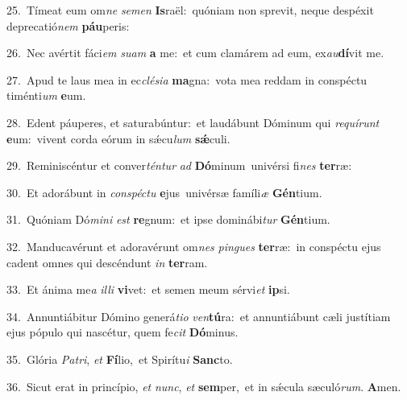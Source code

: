 {\numbfont\textcolor{\numbcolor}{25.}}~Tímeat eum om\textit{ne} \textit{se}\-\textit{men} \textbf{Is}\-raël:~\star quóniam non sprevit, neque despéxit deprecatió\textit{nem} \textbf{páu}\-peris:\par
{\numbfont\textcolor{\numbcolor}{26.}}~Nec avértit fáci\textit{em} \textit{su}\-\textit{am} \textbf{a} me:~\star et cum clamárem ad eum, ex\-\textit{au}\-\textbf{dí}vit me.\par
{\numbfont\textcolor{\numbcolor}{27.}}~Apud te laus mea in ec\-\textit{clé}\-\textit{si}\textit{a} \textbf{ma}\-gna:~\star vota mea reddam in conspéctu timénti\textit{um} \textbf{e}\-um.\par
{\numbfont\textcolor{\numbcolor}{28.}}~Edent páuperes, et saturabúntur:~\dagger et laudábunt Dóminum qui \textit{re}\-\textit{quí}\textit{runt} \textbf{e}\-um:~\star vivent corda eórum in sǽcu\textit{lum} \textbf{sǽ}\-culi.\par
{\numbfont\textcolor{\numbcolor}{29.}}~Reminiscéntur et conver\-\textit{tén}\-\textit{tur} \textit{ad} \textbf{Dó}\-minum~\star univérsi fi\textit{nes} \textbf{ter}\-ræ:\par
{\numbfont\textcolor{\numbcolor}{30.}}~Et adorábunt in \textit{con}\-\textit{spéc}\textit{tu} \textbf{e}\-jus~\star univérsæ famíli\textit{æ} \textbf{Gén}\-tium.\par
{\numbfont\textcolor{\numbcolor}{31.}}~Quóniam Dó\-\textit{mi}\-\textit{ni} \textit{est} \textbf{re}\-gnum:~\star et ipse dominábi\textit{tur} \textbf{Gén}\-tium.\par
{\numbfont\textcolor{\numbcolor}{32.}}~Manducavérunt et adoravérunt om\textit{nes} \textit{pin}\-\textit{gues} \textbf{ter}\-ræ:~\star in conspéctu ejus cadent omnes qui descéndunt \textit{in} \textbf{ter}\-ram.\par
{\numbfont\textcolor{\numbcolor}{33.}}~Et ánima me\textit{a} \textit{il}\-\textit{li} \textbf{vi}\-vet:~\star et semen meum sérvi\textit{et} \textbf{ip}\-si.\par
{\numbfont\textcolor{\numbcolor}{34.}}~Annuntiábitur Dómino generá\-\textit{ti}\-\textit{o} \textit{ven}\-\textbf{tú}ra:~\star et annuntiábunt cæli justítiam ejus pópulo qui nascétur, quem fe\textit{cit} \textbf{Dó}\-minus.\par
{\numbfont\textcolor{\numbcolor}{35.}}~Glória \textit{Pa}\-\textit{tri}, \textit{et} \textbf{Fí}\-lio,~\star et Spirítu\textit{i} \textbf{Sanc}\-to.\par
{\numbfont\textcolor{\numbcolor}{36.}}~Sicut erat in princípio, \textit{et} \textit{nunc}\-, \textit{et} \textbf{sem}\-per,~\star et in sǽcula sæculó\-\textit{rum}\-. \textbf{A}\-men.\par
